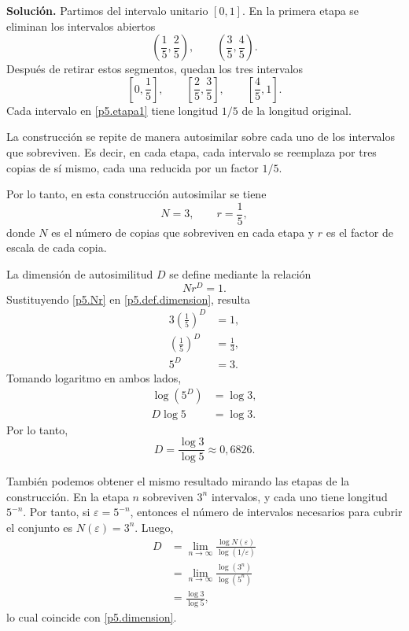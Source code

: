 \documentclass[12pt]{article}
\newcommand{\solucion}{\textbf{Solución.}\enspace}
\begin{document}
\solucion
Partimos del intervalo unitario $[0,1]$. En la primera etapa se eliminan los intervalos abiertos
\begin{equation*}
    \left(\frac{1}{5},\frac{2}{5}\right),
    \qquad
    \left(\frac{3}{5},\frac{4}{5}\right).
\end{equation*}
Después de retirar estos segmentos, quedan los tres intervalos
\begin{equation}\label{p5.etapa1}
    \left[0,\frac{1}{5}\right],
    \qquad
    \left[\frac{2}{5},\frac{3}{5}\right],
    \qquad
    \left[\frac{4}{5},1\right].
\end{equation}
Cada intervalo en \eqref{p5.etapa1} tiene longitud $1/5$ de la longitud original.

La construcción se repite de manera autosimilar sobre cada uno de los intervalos que sobreviven. Es decir, en cada etapa, cada intervalo se reemplaza por tres copias de sí mismo, cada una reducida por un factor $1/5$.

Por lo tanto, en esta construcción autosimilar se tiene
\begin{equation}\label{p5.Nr}
    N=3,
    \qquad
    r=\frac{1}{5},
\end{equation}
donde $N$ es el número de copias que sobreviven en cada etapa y $r$ es el factor de escala de cada copia.

La dimensión de autosimilitud $D$ se define mediante la relación
\begin{equation}\label{p5.def.dimension}
    N r^D=1.
\end{equation}
Sustituyendo \eqref{p5.Nr} en \eqref{p5.def.dimension}, resulta
\begin{align*}
    3\left(\frac{1}{5}\right)^D&=1,\\
    \left(\frac{1}{5}\right)^D&=\frac{1}{3},\\
    5^D&=3.
\end{align*}
Tomando logaritmo en ambos lados,
\begin{align*}
    \log(5^D)&=\log 3,\\
    D\log 5&=\log 3.
\end{align*}
Por lo tanto,
\begin{equation}\label{p5.dimension}
    D=\frac{\log 3}{\log 5}\approx 0{,}6826.
\end{equation}

También podemos obtener el mismo resultado mirando las etapas de la construcción. En la etapa $n$ sobreviven $3^n$ intervalos, y cada uno tiene longitud $5^{-n}$. Por tanto, si $\varepsilon=5^{-n}$, entonces el número de intervalos necesarios para cubrir el conjunto es $N(\varepsilon)=3^n$. Luego,
\begin{align*}
    D
    &=\lim_{n\to\infty}\frac{\log N(\varepsilon)}{\log(1/\varepsilon)}\\
    &=\lim_{n\to\infty}\frac{\log(3^n)}{\log(5^n)}\\
    &=\frac{\log 3}{\log 5},
\end{align*}
lo cual coincide con \eqref{p5.dimension}.
\end{document}
